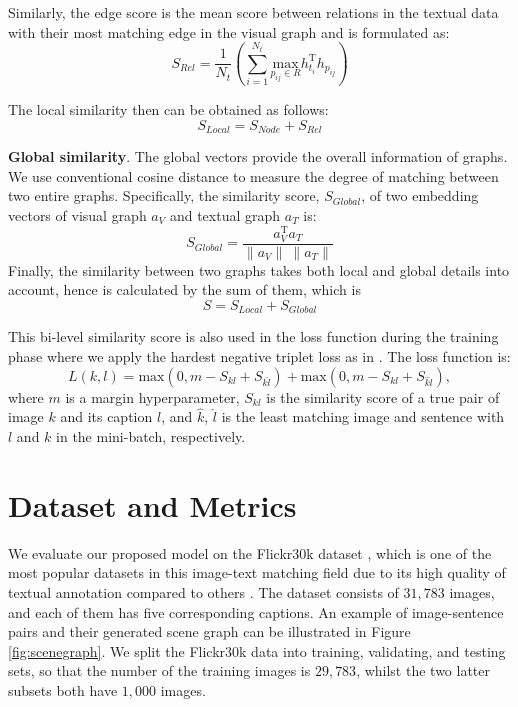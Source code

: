 \documentclass{IOS-Book-Article}
\begin{document}
Similarly, the edge score is the mean score between relations in the textual data with their most matching edge in the visual graph and is formulated as:
\begin{equation}
    S_{Rel} = \frac{1}{N_t} \left(\sum_{i=1}^{N_t}\underset{p_{ij}\in R}{\mathrm{max}}h_{t_i}^\text{T}h_{p_{ij}}\right)
\end{equation}

The local similarity then can be obtained as follows:
\begin{equation}
    S_{Local} = S_{Node} + S_{Rel}
\end{equation}

\textbf{Global similarity}. The global vectors provide the overall information of graphs. We use conventional cosine distance to measure the degree of matching between two entire graphs. Specifically, the similarity score, $S_{Global}$, of two embedding vectors of visual graph $a_V$ and textual graph $a_T$ is:
\begin{equation}
    S_{Global} = \frac{a^\text{T}_Va_T}{\|a_V\| \: \|a_T\|}
\end{equation}
Finally, the similarity between two graphs takes both local and global details into account, hence is calculated by the sum of them, which is 
\begin{equation}
    S = S_{Local} + S_{Global}
\end{equation}

This bi-level similarity score is also used in the loss function during the training phase where we apply the hardest negative triplet loss as in \cite{faghri2017vse++,wang2020cross}. The loss function is:
\begin{equation}
    L(k,l) = \text{max}(0, m - S_{kl} + S_{k\hat{l}}) + \text{max}(0, m - S_{kl} + S_{\hat{k}l}),
\label{eq:loss}
\end{equation}
where $m$ is a margin hyperparameter, $S_{kl}$ is the similarity score of a true pair of image $k$ and its caption $l$, and $\hat{k}$, $\hat{l}$ is the least matching image and sentence with $l$ and $k$ in the mini-batch, respectively.

\section{Dataset and Metrics}
We evaluate our proposed model on the Flickr30k dataset \cite{flickr30k}, which is one of the most popular datasets in this image-text matching field due to its high quality of textual annotation compared to others \cite{plummer2015flickr30k}. The dataset consists of $31,783$ images, and each of them has five corresponding captions. An example of image-sentence pairs and their generated scene graph can be illustrated in Figure \ref{fig:scenegraph}. We split the Flickr30k data into training, validating, and testing sets, so that the number of the training images is $29,783$, whilst the two latter subsets both have $1,000$ images.
\end{document}
